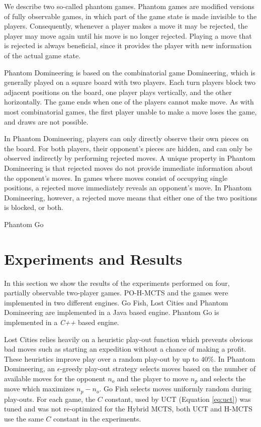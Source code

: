 \documentclass[a4paper]{llncs}
\begin{document}
We describe two so-called phantom games. Phantom games are modified versions of fully observable games, in which part of the game state is made invisible to the players. Consequently, whenever a player makes a move it may be rejected, the player may move again until his move is no longer rejected. Playing a move that is rejected is always beneficial, since it provides the player with new information of the actual game state.

{\sc Phantom Domineering} is based on the combinatorial game Domineering, which is generally played on a square board with two players. Each turn players block two adjacent positions on the board, one player plays vertically, and the other horizontally. The game ends when one of the players cannot make move. As with most combinatorial games, the first player unable to make a move loses the game, and draws are not possible.

In Phantom Domineering, players can only directly observe their own pieces on the board. For both players, their opponent's pieces are hidden, and can only be observed indirectly by performing rejected moves. A unique property in Phantom Domineering is that rejected moves do not provide immediate information about the opponent's moves. In games where moves consist of occupying single positions, a rejected move immediately reveals an opponent's move. In Phantom Domineering, however, a rejected move means that either one of the two positions is blocked, or both.

{\sc Phantom Go} 


\section{Experiments and Results}
\label{sec:exp_res}
In this section we show the results of the experiments performed on four, partially observable two-player games. PO-H-MCTS and the games were implemented in two different engines. Go Fish, Lost Cities and Phantom Domineering are implemented in a Java based engine. Phantom Go is implemented in a \emph{C++} based engine.

Lost Cities relies heavily on a heuristic play-out function which prevents obvious bad moves such as starting an expedition without a chance of making a profit. These heuristics improve play over a random play-out by up to $40\%$.
In Phantom Domineering, an $\epsilon$-greedy play-out strategy selects moves based on the number of available moves for the opponent $n_o$ and the player to move $n_p$ and selects the move which maximizes $n_p - n_o$.
Go Fish selects moves uniformly random during play-outs.
For each game, the $C$ constant, used by UCT (Equation \ref{eq:uct}) was tuned and was not re-optimized for the Hybrid MCTS, both UCT and H-MCTS use the same $C$ constant in the experiments.
\end{document}
